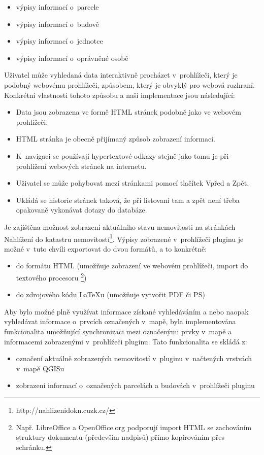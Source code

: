 \documentclass[a4paper,12pt]{article}
\begin{document}
\begin{itemize}
        \item výpisy informací o~parcele
        \item výpisy informací o~budově
        \item výpisy informací o~jednotce
        \item výpisy informací o~oprávněné osobě
\end{itemize}
Uživatel může vyhledaná data interaktivně procházet v~prohlížeči, který je podobný webovému prohlížeči,
způsobem, který je obvyklý pro webová rozhraní.
Konkrétní vlastnosti tohoto způsobu a naší implementace jsou následující:
\begin{itemize}
\item Data jsou zobrazena ve formě HTML stránek podobně jako ve webovém prohlížeči.
\item HTML stránka je obecně přijímaný způsob zobrazení informací.
\item K~navigaci se používají hypertextové odkazy stejně jako tomu je při prohlížení webových stránek na internetu.
\item Uživatel se může pohybovat mezi stránkami pomocí tlačítek Vpřed a Zpět.
\item Ukládá se historie stránek taková, že při listovaní tam a zpět není třeba opakovaně vykonávat dotazy do databáze.
\end{itemize}
Je zajištěna možnost zobrazení aktuálního stavu nemovitosti na stránkách Nahlížení do katastru nemovitostí\footnote{http://nahlizenidokn.cuzk.cz/}.
Výpisy zobrazené v~prohlížeči pluginu je možné v~tuto chvíli exportovat do dvou formátů, a to konkrétně:

\begin{itemize}
\item do formátu HTML (umožňuje zobrazení ve webovém prohlížeči, import do textového procesoru \footnote{Např. LibreOffice a OpenOffice.org podporují import HTML se zachováním struktury dokumentu (především nadpisů) přímo kopírováním přes schránku.})
\item do zdrojového kódu LaTeXu (umožňuje vytvořit PDF či PS)
\end{itemize}

Aby bylo možné plně využívat informace získané vyhledáváním a nebo naopak vyhledávat informace o~prvcích označených v~mapě, byla implementována funkcionalita umožňující synchronizaci mezi označenými prvky v~mapě a informacemi zobrazenými v~prohlížeči pluginu. Tato funkcionalita se skládá z:
\begin{itemize}
\item označení aktuálně zobrazených nemovitostí v~pluginu v~načtených vrstvách v~mapě QGISu
\item zobrazení informací o~označených parcelách a budovách v~prohlížeči pluginu
\end{itemize}
\end{document}
